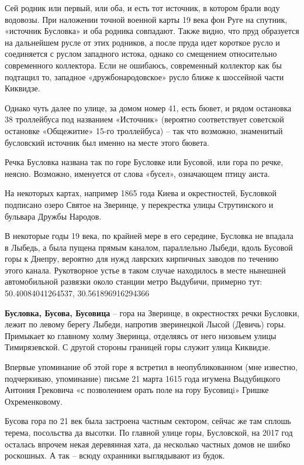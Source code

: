 Сей родник или первый, или оба, и есть тот источник, в котором брали воду водовозы. При наложении точной военной карты 19 века фон Руге на спутник, «источник Бусловка» и оба родника совпадают. Также видно, что пруд образуется на дальнейшем русле от этих родников, а после пруда идет короткое русло и соединяется с руслом западного истока, однако со смещением относительно современного коллектора. Если не ошибаюсь, современный коллектор как бы подтащил то, западное «дружбонародовское» русло ближе к шоссейной части Киквидзе.

Однако чуть далее по улице, за домом номер 41, есть бювет, и рядом остановка 38 троллейбуса под названием «Источник» (вероятно соответствует советской остановке «Общежитие» 15-го троллейбуса) – так что возможно, знаменитый бусловский источник был именно на месте этого бювета.

Речка Бусловка названа так по горе Бусловке или Бусовой, или гора по речке, неясно. Возможно, именуется от слова «бусел», означающем птицу аиста.

На некоторых картах, например 1865 года Киева и окрестностей, Бусловкой подписано озеро Святое на Зверинце, у перекрестка улицы Струтинского и бульвара Дружбы Народов.

В некоторые годы 19 века, по крайней мере в его середине, Бусловка не впадала в Лыбедь, а была пущена прямым каналом, параллельно Лыбеди, вдоль Бусовой горы к Днепру, вероятно для нужд лаврских кирпичных заводов по течению этого канала. Рукотворное устье в таком случае находилось в месте нынешней автомобильной развязки около станции метро Выдубичи, примерно тут:\\ 50.40084041264537, 30.561896916294366\\

\medskip

\textbf{Бусловка, Бусова, Бусовица} – гора на Зверинце, в окрестностях речки Бусловки, лежит по левому берегу Лыбеди, напротив зверинецкой Лысой (Девичь) горы. Примыкает ко главному холму Зверинца, отделяясь от него низовьем улицы Тимирязевской. С другой стороны границей горы служит улица Киквидзе. 

Впервые упоминание об этой горе я встретил в не\-опубликованном (мне известно, подчеркиваю, упоминание) письме 21 марта 1615 года игумена Выдубицкого Антония Грековича «с позволением орать поле на гору Бусовицi» Гришке Охременковому.

Бусова гора по 21 век была застроена частным сектором, сейчас же там сплошь терема, посольства да высотки. По главной улице горы, Бусловской, на 2017 год осталась впрочем некая деревянная хата, да несколько частных домов не шибко роскошных. А так – всюду охранники выглядывают из будок.\\ 

